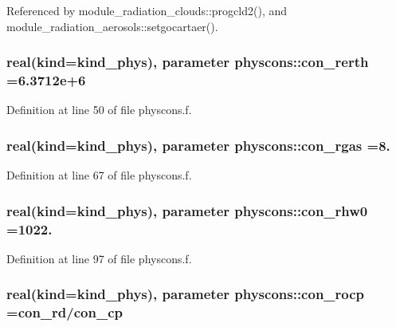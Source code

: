 Referenced by module\+\_\+radiation\+\_\+clouds\+::progcld2(), and module\+\_\+radiation\+\_\+aerosols\+::setgocartaer().

\subsubsection[{\texorpdfstring{con\+\_\+rerth}{con_rerth}}]{\setlength{\rightskip}{0pt plus 5cm}real(kind=kind\+\_\+phys), parameter physcons\+::con\+\_\+rerth =6.\+3712e+6}\hypertarget{namespacephyscons_a45809304b133b2581328b19b36dd47bc}{}\label{namespacephyscons_a45809304b133b2581328b19b36dd47bc}


Definition at line 50 of file physcons.\+f.

\subsubsection[{\texorpdfstring{con\+\_\+rgas}{con_rgas}}]{\setlength{\rightskip}{0pt plus 5cm}real(kind=kind\+\_\+phys), parameter physcons\+::con\+\_\+rgas =8.}\hypertarget{namespacephyscons_ab693404d71b608617bcb6efe24cb57c6}{}\label{namespacephyscons_ab693404d71b608617bcb6efe24cb57c6}


Definition at line 67 of file physcons.\+f.

\subsubsection[{\texorpdfstring{con\+\_\+rhw0}{con_rhw0}}]{\setlength{\rightskip}{0pt plus 5cm}real(kind=kind\+\_\+phys), parameter physcons\+::con\+\_\+rhw0 =1022.}\hypertarget{namespacephyscons_ae553a2a2cea3086dd27d8f88a56d66e1}{}\label{namespacephyscons_ae553a2a2cea3086dd27d8f88a56d66e1}


Definition at line 97 of file physcons.\+f.

\subsubsection[{\texorpdfstring{con\+\_\+rocp}{con_rocp}}]{\setlength{\rightskip}{0pt plus 5cm}real(kind=kind\+\_\+phys), parameter physcons\+::con\+\_\+rocp ={\bf con\+\_\+rd}/{\bf con\+\_\+cp}}\hypertarget{namespacephyscons_a72b27573c69ec418b67763d35b3688a1}{}\label{namespacephyscons_a72b27573c69ec418b67763d35b3688a1}


